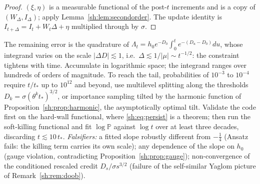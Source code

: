 \documentclass[11pt]{article}
\numberwithin{equation}{section}
\theoremstyle{plain}
\theoremstyle{definition}
\theoremstyle{remark}
\newcommand{\PP}{\mathbb{P}}
\begin{document}
\begin{proof}
$(\xi,\eta)$ is a measurable functional of the post-$t$ increments and is a
copy of $(W_\Delta,I_\Delta)$; apply Lemma~\ref{sh:lem:secondorder}. The
update identity is
$I_{t+\Delta}=I_t+W_t\Delta+\eta$ multiplied through by $\sigma$.
\end{proof}

The remaining error is the quadrature of
$\Lambda_t=h_0e^{-D_0}\int_0^te^{-(D_u-D_0)}du$, whose integrand varies on
the scale $|\Delta D|\lesssim1$, i.e.\ $\Delta\lesssim1/|\mu|\sim
t^{-1/2}$: the constraint tightens with time. Accumulate in logarithmic
space; the integrand ranges over hundreds of orders of magnitude. To reach
the tail, probabilities of $10^{-3}$ to $10^{-4}$ require
$t/t_*$ up to $10^{12}$ and beyond, use multilevel splitting along the
thresholds $D_k=\sigma(\theta^kt_*)^{3/2}$, or importance sampling tilted
by the harmonic function of Proposition~\ref{sh:prop:harmonic}, the
asymptotically optimal tilt. Validate the code first on the hard-wall
functional, where \eqref{sh:eq:persist} is a theorem; then run the
soft-killing functional and fit $\log\PP$ against $\log t$ over at least
three decades, discarding $t\lesssim10\,t_*$.
\emph{Falsifiers:} a fitted slope robustly different from $-\tfrac14$
(Ansatz fails: the killing term carries its own scale); any dependence of
the slope on $h_0$ (gauge violation, contradicting
Proposition~\ref{sh:prop:gauge}); non-convergence of the conditioned
rescaled credit $D_s/\sigma s^{3/2}$ (failure of the self-similar Yaglom
picture of Remark~\ref{sh:rem:doob}).
\end{document}
